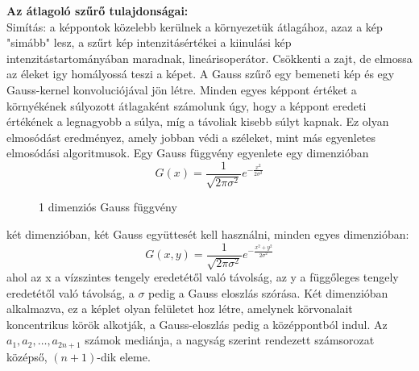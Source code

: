 \textbf{Az átlagoló szűrő tulajdonságai:}\\
Simítás: a képpontok közelebb kerülnek a környezetük átlagához, azaz a kép "simább" lesz, a szűrt kép intenzitásértékei a kiinulási kép intenzitástartományában maradnak, lineárisoperátor. Csökkenti a zajt, de elmossa az éleket igy homályossá teszi a képet.
A Gauss szűrő egy bemeneti kép és egy Gauss-kernel konvoluciójával jön létre. Minden egyes képpont értéket a környékének súlyozott átlagaként számolunk úgy, hogy a képpont eredeti értékének a legnagyobb a súlya, míg a távoliak kisebb súlyt kapnak. Ez olyan elmosódást eredményez, amely jobban védi a széleket, mint más egyenletes elmosódási algoritmusok. Egy Gauss függvény egyenlete egy dimenzióban
$$G(x)=\frac{1}{\sqrt{2\pi\sigma^{2}}}e^{-\frac{x^{2}}{2\sigma^{2}}} $$
\begin{figure}[ht]
\centering
{}
\caption{1 dimenziós Gauss függvény} 
\label{fig: gaussgorbe}
\end{figure}
két dimenzióban, két Gauss együttesét kell használni, minden egyes dimenzióban: 
$$G(x,y)=\frac{1}{\sqrt{2\pi\sigma^{2}}}e^{-\frac{x^{2}+y^{2}}{2\sigma^{2}}} $$
ahol az x a vízszintes tengely eredetétől való távolság, az y a függőleges tengely eredetétől való távolság, a $\sigma$ pedig a Gauss eloszlás szórása. Két dimenzióban alkalmazva, ez a képlet olyan felületet hoz létre, amelynek körvonalait koncentrikus körök alkotják, a Gauss-eloszlás pedig a középpontból indul.
Az $a_1,a_2,\dots,a_{2n+1}$ számok mediánja, a nagyság szerint rendezett számsorozat középső, $(n+1)$-dik eleme.\\
